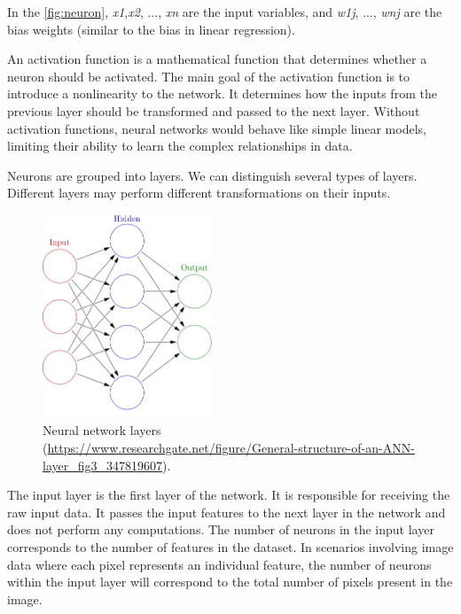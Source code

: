 In the \autoref{fig:neuron}, \textit{x1},\textit{x2}, ..., \textit{xn} are the input variables, and \textit{w1j}, ..., \textit{wnj} are the bias weights (similar to the bias in linear regression).
 
An activation function is a mathematical function that determines whether a neuron should be activated. The main goal of the activation function is to introduce a nonlinearity to the network. It determines how the inputs from the previous layer should be transformed and passed to the next layer. Without activation functions, neural networks would behave like simple linear models, limiting their ability to learn the complex relationships in data.

\medskip

Neurons are grouped into layers. We can distinguish several types of layers. Different layers may perform different transformations on their inputs.

\begin{figure}[htbp]
    \centering
    \includegraphics[width=0.45\textwidth]{obrazky-figures/02-theoretical-basis/Colored_neural_network.png}
    \caption{Neural network layers (\url{https://www.researchgate.net/figure/General-structure-of-an-ANN-layer\_fig3\_347819607}).}
    \label{fig:layers}
\end{figure}


The input layer is the first layer of the network. It is responsible for receiving the raw input data. It passes the input features to the next layer in the network and does not perform any computations. The number of neurons in the input layer corresponds to the number of features in the dataset. In scenarios involving image data where each pixel represents an individual feature, the number of neurons within the input layer will correspond to the total number of pixels present in the image.

